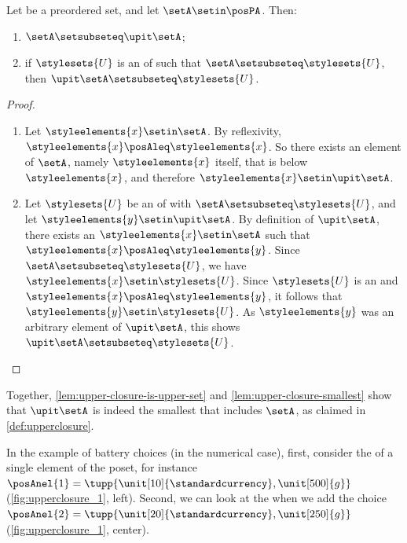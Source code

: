 \begin{lemma}
    \label{lem:upper-closure-smallest}
    Let \posA be a preordered set, and let $\setA\setin \posPA$.
    Then:
    \begin{enumerate}
        \item $\setA \setsubseteq \upit \setA$;
        \item if $\stylesets{U}$ is an  of \posA such that $\setA \setsubseteq \stylesets{U}$, then $\upit \setA \setsubseteq \stylesets{U}$.
    \end{enumerate}
\end{lemma}
\begin{proof}
    \begin{enumerate}
        \item Let $\styleelements{x}\setin \setA$.
        By reflexivity, $\styleelements{x}\posAleq \styleelements{x}$.
        So there exists an element of $\setA$, namely $\styleelements{x}$ itself, that is below $\styleelements{x}$, and therefore $\styleelements{x}\setin \upit \setA$.
        \item Let $\stylesets{U}$ be an  of \posA with $\setA \setsubseteq \stylesets{U}$, and let $\styleelements{y}\setin \upit \setA$.
        By definition of $\upit \setA$, there exists an $\styleelements{x}\setin \setA$ such that $\styleelements{x}\posAleq \styleelements{y}$.
        Since $\setA \setsubseteq \stylesets{U}$, we have $\styleelements{x}\setin \stylesets{U}$.
        Since $\stylesets{U}$ is an  and $\styleelements{x}\posAleq \styleelements{y}$, it follows that $\styleelements{y}\setin \stylesets{U}$.
        As $\styleelements{y}$ was an arbitrary element of $\upit \setA$, this shows $\upit \setA \setsubseteq \stylesets{U}$.
    \end{enumerate}
\end{proof}
Together, \cref{lem:upper-closure-is-upper-set} and \cref{lem:upper-closure-smallest} show that $\upit \setA$ is indeed the smallest  that includes $\setA$, as claimed in \cref{def:upperclosure}.


In the example of battery choices (in the numerical case), first, consider the  of a single element of the poset, for instance $\posAnel{1}=\tupp{\unit[10]{\standardcurrency},\unit[500]{g}}$ (\cref{fig:upperclosure_1}, left).
Second, we can look at the  when we add the choice $\posAnel{2}=\tupp{\unit[20]{\standardcurrency},\unit[250]{g}}$ (\cref{fig:upperclosure_1}, center).

